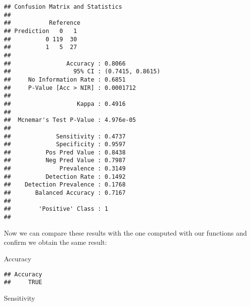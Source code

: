 \documentclass[]{article}
\newenvironment{Shaded}{\begin{snugshade}}{\end{snugshade}}
\newcommand{\DecValTok}[1]{\textcolor[rgb]{0.00,0.00,0.81}{#1}}
\newcommand{\KeywordTok}[1]{\textcolor[rgb]{0.13,0.29,0.53}{\textbf{#1}}}
\newcommand{\NormalTok}[1]{#1}
\newcommand{\OperatorTok}[1]{\textcolor[rgb]{0.81,0.36,0.00}{\textbf{#1}}}
\begin{document}
\begin{verbatim}
## Confusion Matrix and Statistics
## 
##           Reference
## Prediction   0   1
##          0 119  30
##          1   5  27
##                                           
##                Accuracy : 0.8066          
##                  95% CI : (0.7415, 0.8615)
##     No Information Rate : 0.6851          
##     P-Value [Acc > NIR] : 0.0001712       
##                                           
##                   Kappa : 0.4916          
##                                           
##  Mcnemar's Test P-Value : 4.976e-05       
##                                           
##             Sensitivity : 0.4737          
##             Specificity : 0.9597          
##          Pos Pred Value : 0.8438          
##          Neg Pred Value : 0.7987          
##              Prevalence : 0.3149          
##          Detection Rate : 0.1492          
##    Detection Prevalence : 0.1768          
##       Balanced Accuracy : 0.7167          
##                                           
##        'Positive' Class : 1               
## 
\end{verbatim}

Now we can compare these results with the one computed with our
functions and confirm we obtain the same result:

Accuracy

\begin{Shaded}
\end{Shaded}

\begin{verbatim}
## Accuracy 
##     TRUE
\end{verbatim}

Sensitivity

\begin{Shaded}
\end{Shaded}
\end{document}
